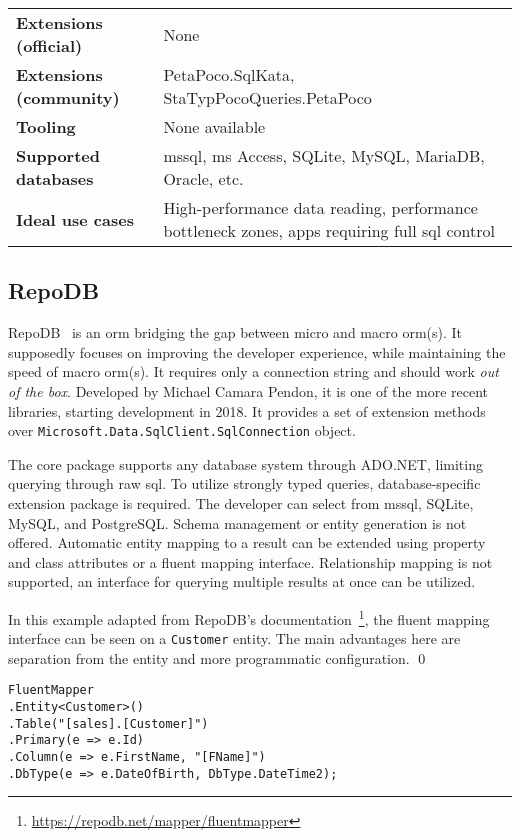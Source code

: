 {\begin{landscape}
\begin{table}[p]
\begin{tabular}{
>{\raggedright\arraybackslash}p{40.00mm}
>{\arraybackslash}p{150.00mm}
}
\textbf{Extensions (official)} & None \\
\textbf{Extensions (community)} & PetaPoco.SqlKata, StaTypPocoQueries.PetaPoco \\
\textbf{Tooling} & None available \\
\textbf{Supported databases} & \acrshort{mssql}, \acrshort{ms} Access, SQLite, MySQL, MariaDB, Oracle, etc. \\
\textbf{Ideal use cases} & High-performance data reading, performance bottleneck zones, apps requiring full \acrshort{sql} control \\
\bottomrule
\end{tabular}
\end{table}
\end{landscape}
}



\subsection{RepoDB}
RepoDB~\cite{RepoDB, RepoDBRepo} is an \acrshort{orm} bridging the gap between micro and macro \acrshort{orm}(s). It supposedly focuses on improving the developer experience, while maintaining the speed of macro \acrshort{orm}(s). It requires only a connection string and should work \textit{out of the box}. Developed by Michael Camara Pendon, it is one of the more recent libraries, starting development in 2018. It provides a set of extension methods over \texttt{Microsoft.Data.SqlClient.SqlConnection} object. 

The core package supports any database system through ADO.NET, limiting querying through raw \acrshort{sql}. To utilize strongly typed queries, database-specific extension package is required. The developer can select from \acrshort{mssql}, SQLite, MySQL, and PostgreSQL. Schema management or entity generation is not offered. Automatic entity mapping to a result can be extended using property and class attributes or a fluent mapping interface. Relationship mapping is not supported, an interface for querying multiple results at once can be utilized.

\begin{example}
\small
In this example adapted from RepoDB's documentation~\footnote{\url{https://repodb.net/mapper/fluentmapper}}, the fluent mapping interface can be seen on a \texttt{Customer} entity. The main advantages here are separation from the entity and more programmatic configuration.
\qed

\begin{lstlisting}[language=CSharp]
FluentMapper
.Entity<Customer>()
.Table("[sales].[Customer]")
.Primary(e => e.Id)
.Column(e => e.FirstName, "[FName]")
.DbType(e => e.DateOfBirth, DbType.DateTime2);
\end{lstlisting}
\end{example}

